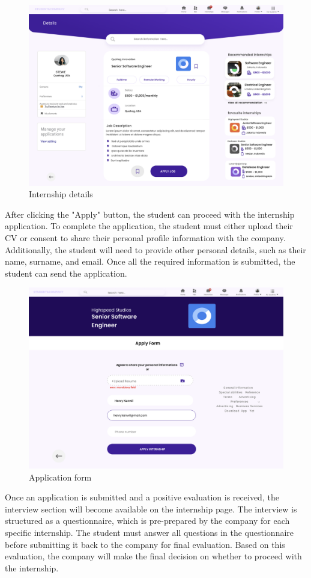 \begin{figure} [H]
    \centering
    \includegraphics[width=0.5\linewidth]{Interface Images/student interface/Screenshot 2024-12-12 045619.png}
    \caption{Internship details}
    \label{fig:Internship details}
\end{figure}

After clicking the "Apply" button, the student can proceed with the internship application. To complete the application, the student must either upload their CV or consent to share their personal profile information with the company. Additionally, the student will need to provide other personal details, such as their name, surname, and email. Once all the required information is submitted, the student can send the application.

\begin{figure} [H]
    \centering
    \includegraphics[width=0.5\linewidth]{Interface Images/student interface/Screenshot 2024-12-12 045639.png}
    \caption{Application form}
    \label{fig:Application form}
\end{figure}

Once an application is submitted and a positive evaluation is received, the interview section will become available on the internship page. The interview is structured as a questionnaire, which is pre-prepared by the company for each specific internship. The student must answer all questions in the questionnaire before submitting it back to the company for final evaluation. Based on this evaluation, the company will make the final decision on whether to proceed with the internship.


